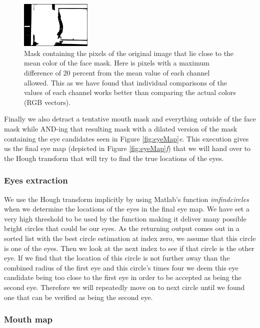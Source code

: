 \begin{figure}[H]
\centering
\includegraphics[width=0.3\textwidth]{img/fd2/averageFaceColorMask.png}
\caption{Mask containing the pixels of the original image that lie close to the mean color of the face mask. Here is pixels with a maximum difference of 20 percent from the mean value of each channel allowed. This as we have found that individual comparisons of the values of each channel works better than comparing the actual colors (RGB vectors).}
\label{fig:averageFaceColorMask}
\end{figure}

Finally we also detract a tentative mouth mask and everything outside of the face mask while AND-ing that resulting mask with a dilated version of the mask containing the eye candidates seen in Figure \ref{fig:eyeMap}\textit{e}. This execution gives us the final eye map (depicted in Figure \ref{fig:eyeMap}\textit{f}) that we will hand over to the Hough transform that will try to find the true locations of the eyes.

\subsubsection{Eyes extraction}

We use the Hough transform implicitly by using Matlab's function \textit{imfindcircles} when we determine the locations of the eyes in the final eye map. We have set a very high threshold to be used by the function making it deliver many possible bright circles that could be our eyes. As the returning output comes out in a sorted list with the best circle estimation at index zero, we assume that this circle is one of the eyes. Then we look at the next index to see if that circle is the other eye. If we find that the location of this circle is not further away than the combined radius of the first eye and this circle's times four we deem this eye candidate being too close to the first eye in order to be accepted as being the second eye. Therefore we will repeatedly move on to next circle until we found one that can be verified as being the second eye.

\subsubsection{Mouth map}

